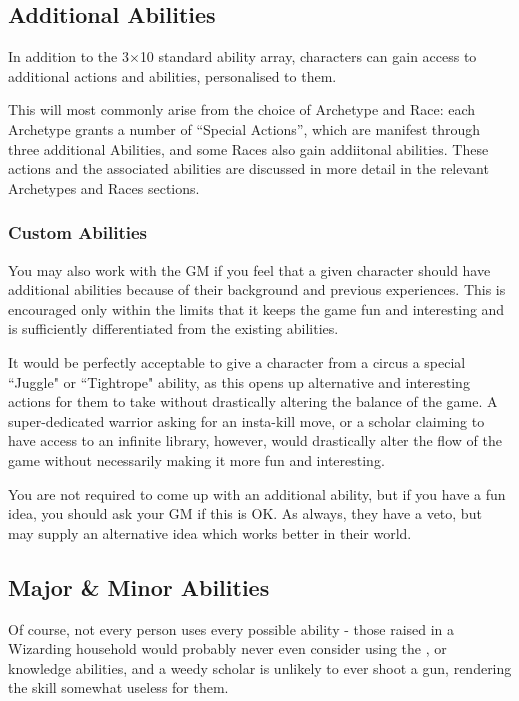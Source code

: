 \subsection{Additional Abilities}

In addition to the 3$\times$10 standard ability array, characters can gain access to additional actions and abilities, personalised to them. 

This will most commonly arise from the choice of Archetype and Race: each Archetype grants a number of ``Special Actions'', which are manifest through three additional Abilities, and some Races also gain addiitonal abilities. These actions and the associated abilities are discussed in more detail in the relevant Archetypes and Races sections. 


\subsubsection{Custom Abilities}
You may also work with the GM if you feel that a given character should have additional abilities because of their background and previous experiences. This is encouraged only within the limits that it keeps the game fun and interesting and is sufficiently differentiated from the existing abilities.

It would be perfectly acceptable to give a character from a circus a special ``Juggle" or ``Tightrope" ability, as this opens up alternative and interesting actions for them to take without drastically altering the balance of the game. A super-dedicated warrior asking for an insta-kill move, or a scholar claiming to have access to an infinite library, however, would drastically alter the flow of the game without necessarily making it more fun and interesting. 

You are not required to come up with an additional ability, but if you have a fun idea, you should ask your GM if this is OK. As always, they have a veto, but may supply an alternative idea which works better in their world. 


\subsection{Major \& Minor Abilities}

Of course, not every person uses every possible ability - those raised in a Wizarding household would probably never even consider using the , or  knowledge abilities, and a weedy scholar is unlikely to ever shoot a gun, rendering the  skill somewhat useless for them. 

